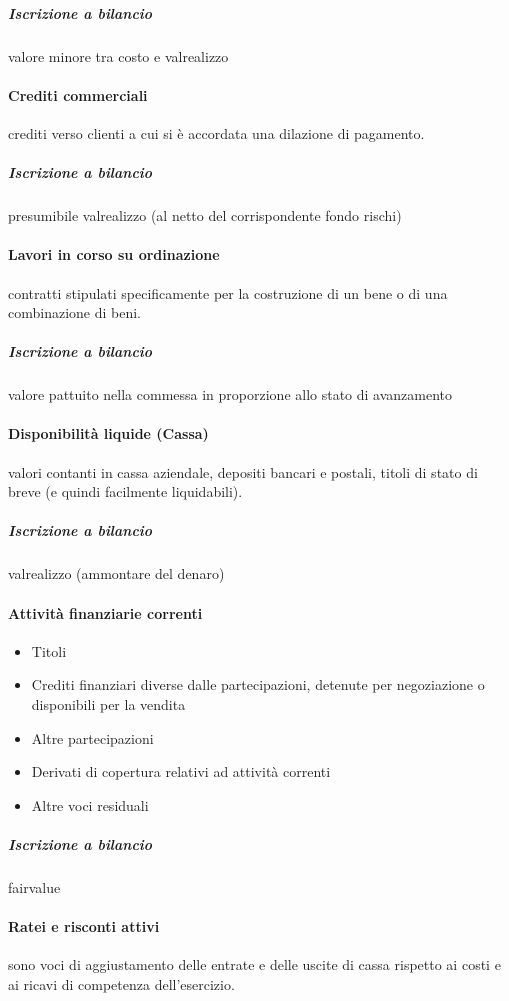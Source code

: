 \subparagraph{Iscrizione a bilancio} valore minore tra \gls{costo} e \gls{valrealizzo}

\paragraph{Crediti commerciali} crediti verso clienti a cui si è accordata una dilazione di pagamento.
\subparagraph{Iscrizione a bilancio} presumibile \gls{valrealizzo} (al netto del corrispondente fondo rischi)

\paragraph{Lavori in corso su ordinazione} contratti stipulati specificamente per la costruzione di un bene o di una combinazione di beni.
\subparagraph{Iscrizione a bilancio} valore pattuito nella commessa in proporzione allo stato di avanzamento

\paragraph{Disponibilità liquide (Cassa)} valori contanti in cassa aziendale,
depositi bancari e postali, titoli di stato di breve (e quindi facilmente liquidabili).
\subparagraph{Iscrizione a bilancio} \gls{valrealizzo} (ammontare del denaro)

\paragraph{Attività finanziarie correnti}
\begin{itemize}
    \item Titoli
    \item Crediti finanziari 
    diverse dalle partecipazioni, detenute per negoziazione o disponibili per la vendita
    \item Altre partecipazioni
    \item Derivati di copertura relativi ad attività correnti
    \item Altre voci residuali
\end{itemize}
\subparagraph{Iscrizione a bilancio} \gls{fairvalue}

\paragraph{Ratei e risconti attivi} sono voci di aggiustamento delle entrate e
delle uscite di cassa rispetto ai costi e ai ricavi di competenza dell’esercizio.

